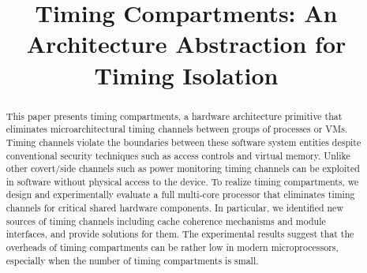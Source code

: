 \title{
\vspace{-0.1in}
    Timing Compartments: An Architecture Abstraction for Timing Isolation
}



\date{}
\maketitle

\thispagestyle{empty}

\begin{abstract}
    This paper presents timing compartments, a hardware architecture primitive 
    that eliminates microarchitectural timing channels between groups of 
    processes or VMs. Timing channels violate the boundaries between these 
    software system entities despite conventional security techniques such as 
    access controls and virtual memory. Unlike other covert/side channels such 
    as power monitoring timing channels can be exploited in software without 
    physical access to the device. 
    To realize timing 
    compartments, we design and experimentally evaluate a full multi-core 
    processor that eliminates timing channels for critical shared hardware 
    components. 
    In particular, we identified new sources of timing channels including
    cache coherence mechanisms and module interfaces, and provide solutions for them.
    The experimental results suggest that the overheads of
    timing compartments can be rather low in modern microprocessors, especially 
    when the number of timing compartments is small.

\end{abstract}
